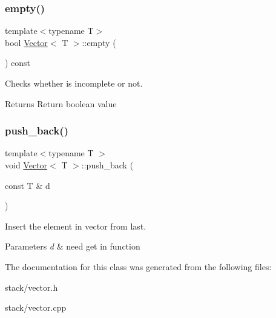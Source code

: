 \subsubsection{\texorpdfstring{empty()}{empty()}}
{\footnotesize\ttfamily template$<$typename T$>$ \\
bool \hyperlink{classVector}{Vector}$<$ T $>$\+::empty (\begin{DoxyParamCaption}{ }\end{DoxyParamCaption}) const}



Checks whether is incomplete or not. 

\begin{DoxyReturn}{Returns}
Return boolean value 
\end{DoxyReturn}
\mbox{\label{classVector_aed29bfc8028b4c6c18ebe89ed3f02119}} 
\subsubsection{\texorpdfstring{push\+\_\+back()}{push\_back()}}
{\footnotesize\ttfamily template$<$typename T $>$ \\
void \hyperlink{classVector}{Vector}$<$ T $>$\+::push\+\_\+back (\begin{DoxyParamCaption}\item[{const T \&}]{d }\end{DoxyParamCaption})}



Insert the element in vector from last. 


\begin{DoxyParams}{Parameters}
{\em d} & need get in function \\
\hline
\end{DoxyParams}


The documentation for this class was generated from the following files\+:\begin{DoxyCompactItemize}
\item 
stack/vector.\+h\item 
stack/vector.\+cpp\end{DoxyCompactItemize}

